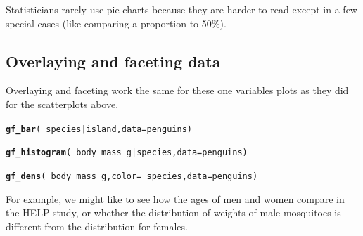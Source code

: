 \documentclass[twoside]{book}\usepackage[]{graphicx}\usepackage[]{xcolor}
\makeatletter
\newcommand{\hlopt}[1]{\textcolor[rgb]{0,0,0}{#1}}%
\newcommand{\hlstd}[1]{\textcolor[rgb]{0.345,0.345,0.345}{#1}}%
\newcommand{\hlkwc}[1]{\textcolor[rgb]{0.333,0.667,0.333}{#1}}%
\newcommand{\hlkwd}[1]{\textcolor[rgb]{0.737,0.353,0.396}{\textbf{#1}}}%
\newenvironment{kframe}{%
 \def\at@end@of@kframe{}%
 \ifinner\ifhmode%
  \def\at@end@of@kframe{\end{minipage}}%
  \begin{minipage}{\columnwidth}%
 \fi\fi%
 \def\FrameCommand##1{\hskip\@totalleftmargin \hskip-\fboxsep
 \colorbox{shadecolor}{##1}\hskip-\fboxsep
     \hskip-\linewidth \hskip-\@totalleftmargin \hskip\columnwidth}%
 \MakeFramed {\advance\hsize-\width
   \@totalleftmargin\z@ \linewidth\hsize
   \@setminipage}}%
 {\par\unskip\endMakeFramed%
 \at@end@of@kframe}
\newenvironment{knitrout}{}{} %
\newcounter{example}[section]
\makeatother
\begin{document}
Statisticians rarely use pie charts because they are harder to read except in a few special cases (like comparing
a proportion to 50\%).

\subsection{Overlaying and faceting data}

Overlaying and faceting work the same for these one variables plots as they did for the scatterplots above.

\begin{knitrout}
\color{fgcolor}\begin{kframe}
\begin{alltt}
\hlkwd{gf_bar}\hlstd{(} \hlopt{~} \hlstd{species} \hlopt{|} \hlstd{island,} \hlkwc{data} \hlstd{= penguins)}
\end{alltt}


{\ttfamily\noindent\bfseries\color{errorcolor}{\#\# Error in gf\_ingredients(formula = gformula, data = data, gg\_object = object, : object 'penguins' not found}}\begin{alltt}
\hlkwd{gf_histogram}\hlstd{(} \hlopt{~} \hlstd{body_mass_g} \hlopt{|} \hlstd{species,} \hlkwc{data} \hlstd{= penguins)}
\end{alltt}


{\ttfamily\noindent\bfseries\color{errorcolor}{\#\# Error in gf\_ingredients(formula = gformula, data = data, gg\_object = object, : object 'penguins' not found}}\begin{alltt}
\hlkwd{gf_dens}\hlstd{(} \hlopt{~} \hlstd{body_mass_g,} \hlkwc{color} \hlstd{=} \hlopt{~} \hlstd{species,} \hlkwc{data} \hlstd{= penguins)}
\end{alltt}


{\ttfamily\noindent\bfseries\color{errorcolor}{\#\# Error in gf\_ingredients(formula = gformula, data = data, gg\_object = object, : object 'penguins' not found}}\end{kframe}
\end{knitrout}

For example, we might like to see how the ages of men and women compare 
in the HELP study, or whether the distribution of weights of male mosquitoes 
is different from the distribution for females.
\end{document}

